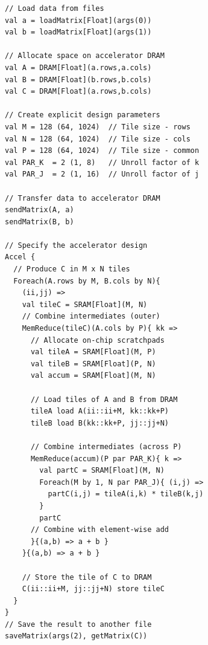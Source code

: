 \newsavebox{\gemm}
\begin{lrbox}{\gemm}
\begin{lstlisting}[language=Spatial,linewidth=0.4\textwidth]
// Load data from files
val a = loadMatrix[Float](args(0))
val b = loadMatrix[Float](args(1))

// Allocate space on accelerator DRAM
val A = DRAM[Float](a.rows,a.cols)
val B = DRAM[Float](b.rows,b.cols)
val C = DRAM[Float](a.rows,b.cols)

// Create explicit design parameters
val M = 128 (64, 1024)  // Tile size - rows
val N = 128 (64, 1024)  // Tile size - cols
val P = 128 (64, 1024)  // Tile size - common
val PAR_K  = 2 (1, 8)   // Unroll factor of k
val PAR_J  = 2 (1, 16)  // Unroll factor of j

// Transfer data to accelerator DRAM
sendMatrix(A, a)
sendMatrix(B, b)

// Specify the accelerator design
Accel {
  // Produce C in M x N tiles
  Foreach(A.rows by M, B.cols by N){
    (ii,jj) =>
    val tileC = SRAM[Float](M, N)
    // Combine intermediates (outer)
    MemReduce(tileC)(A.cols by P){ kk =>
      // Allocate on-chip scratchpads
      val tileA = SRAM[Float](M, P)
      val tileB = SRAM[Float](P, N)
      val accum = SRAM[Float](M, N)

      // Load tiles of A and B from DRAM
      tileA load A(ii::ii+M, kk::kk+P)
      tileB load B(kk::kk+P, jj::jj+N)

      // Combine intermediates (across P)
      MemReduce(accum)(P par PAR_K){ k =>
        val partC = SRAM[Float](M, N)
        Foreach(M by 1, N par PAR_J){ (i,j) =>
          partC(i,j) = tileA(i,k) * tileB(k,j)
        }
        partC
      // Combine with element-wise add
      }{(a,b) => a + b }
    }{(a,b) => a + b }

    // Store the tile of C to DRAM
    C(ii::ii+M, jj::jj+N) store tileC
  }
}
// Save the result to another file
saveMatrix(args(2), getMatrix(C))
\end{lstlisting}
\end{lrbox}

